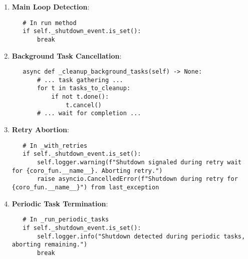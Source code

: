 \documentclass[12pt,a4paper]{article}
\begin{document}
\begin{enumerate}[label=\arabic*.]
    \item \textbf{Main Loop Detection}:
    \begin{pageablecode}
    \begin{verbatim}
   # In run method
   if self._shutdown_event.is_set():
       break
    \end{verbatim}
    \end{pageablecode}
    \item \textbf{Background Task Cancellation}:
    \begin{pageablecode}
    \begin{verbatim}
   async def _cleanup_background_tasks(self) -> None:
       # ... task gathering ...
       for t in tasks_to_cleanup:
           if not t.done():
               t.cancel()
       # ... wait for completion ...
    \end{verbatim}
    \end{pageablecode}
    \item \textbf{Retry Abortion}:
    \begin{pageablecode}
    \begin{verbatim}
   # In _with_retries
   if self._shutdown_event.is_set():
       self.logger.warning(f"Shutdown signaled during retry wait for {coro_fun.__name__}. Aborting retry.")
       raise asyncio.CancelledError(f"Shutdown during retry for {coro_fun.__name__}") from last_exception
    \end{verbatim}
    \end{pageablecode}
    \item \textbf{Periodic Task Termination}:
    \begin{pageablecode}
    \begin{verbatim}
   # In _run_periodic_tasks
   if self._shutdown_event.is_set():
       self.logger.info("Shutdown detected during periodic tasks, aborting remaining.")
       break
    \end{verbatim}
    \end{pageablecode}
\end{enumerate}
\end{document}
